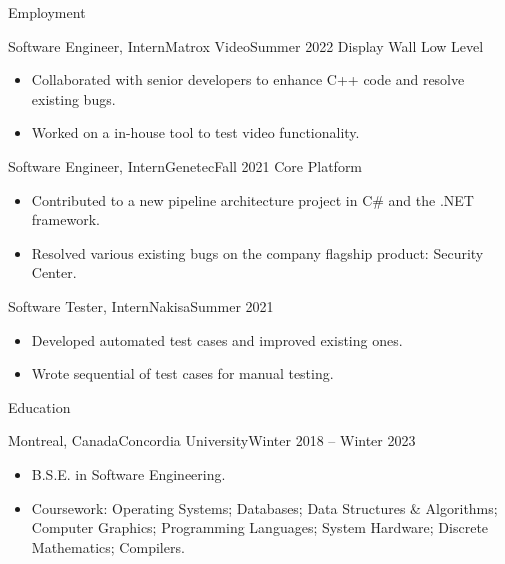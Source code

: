 \documentclass[]{mcdowellcv}
\begin{document}
	\makeheader
	
	\begin{cvsection}{Employment}
		\begin{cvsubsection}{Software Engineer, Intern}{Matrox Video}{Summer 2022}
		    Display Wall Low Level	
			\begin{itemize}
                \item Collaborated with senior developers to enhance C++ code and resolve existing bugs.
                \item Worked on a in-house tool to test video functionality.
			\end{itemize}
		\end{cvsubsection}
		
		\begin{cvsubsection}{Software Engineer, Intern}{Genetec}{Fall 2021}	
            Core Platform
			\begin{itemize}
                \item Contributed to a new pipeline architecture project in C\# and the .NET framework.
                \item Resolved various existing bugs on the company flagship product: Security Center.
			\end{itemize}
		\end{cvsubsection}
		
		\begin{cvsubsection}{Software Tester, Intern}{Nakisa}{Summer 2021}		
			\begin{itemize}
                \item Developed automated test cases and improved existing ones.
                \item Wrote sequential of test cases for manual testing.
			\end{itemize}
		\end{cvsubsection}
	\end{cvsection}
	
	\begin{cvsection}{Education}
		\begin{cvsubsection}{Montreal, Canada}{Concordia University}{Winter 2018 -- Winter 2023}
			\begin{itemize}
				\item B.S.E. in Software Engineering.
                \item Coursework: Operating Systems; Databases; Data Structures \& Algorithms; Computer Graphics; Programming Languages; System Hardware; Discrete Mathematics; Compilers.
			\end{itemize}
		\end{cvsubsection}
	\end{cvsection}
	
\end{document}
